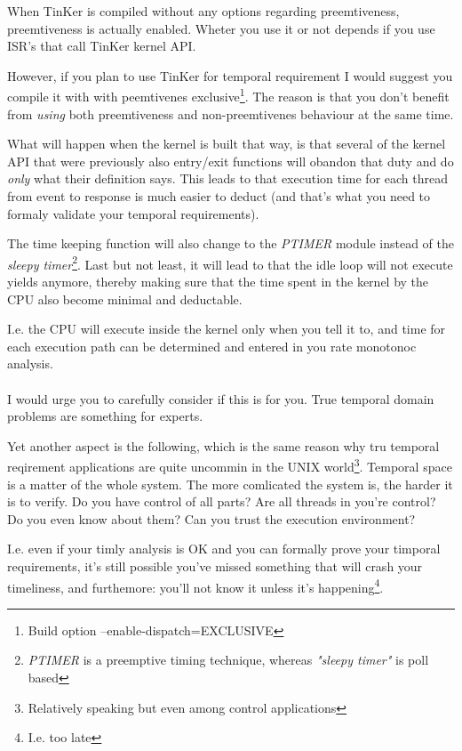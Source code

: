 When TinKer is compiled without any options regarding preemtiveness, preemtiveness is actually enabled. Wheter you use it or not depends if you use ISR's that call TinKer kernel API.

However, if you plan to use TinKer for temporal requirement I would suggest you compile it with with peemtivenes exclusive\footnote{Build option --enable-dispatch=EXCLUSIVE}. The reason is that you don't benefit from \textit{using} both preemtiveness and non-preemtivenes behaviour at the same time.

What will happen when the kernel is built that way, is that several of the kernel API that were previously also entry/exit functions will obandon that duty and do \textit{only} what their definition says. This leads to that execution time for each thread from event to response is much easier to deduct (and that's what you need to formaly validate your temporal requirements).

The time keeping function will also change to the \textit{PTIMER} module instead of the \textit{sleepy timer}\footnote{\textit{PTIMER} is a preemptive timing technique, whereas \textit{"sleepy timer"} is poll based}. Last but not least, it will lead to that the idle loop will not execute yields anymore, thereby making sure that the time spent in the kernel by the CPU also become minimal and deductable. 

I.e. the CPU will execute inside the kernel only when you tell it to, and time for each execution path can be determined and entered in you rate monotonoc analysis.
\\\\
I would urge you to carefully consider if this is for you. True temporal domain problems are something for experts.

Yet another aspect is the following, which is the same reason why tru temporal reqirement applications are quite uncommin in the UNIX world\footnote{Relatively speaking but even among control applications}. Temporal space is a matter of the whole system. The more comlicated the system is, the harder it is to verify. Do you have control of all parts? Are all threads in you're control? Do you even know about them? Can you trust the execution environment?

I.e. even if your timly analysis is OK and you can formally prove your timporal requirements, it's still possible you've missed something that will crash your timeliness, and furthemore: you'll not know it unless it's happening\footnote{I.e. too late}.

